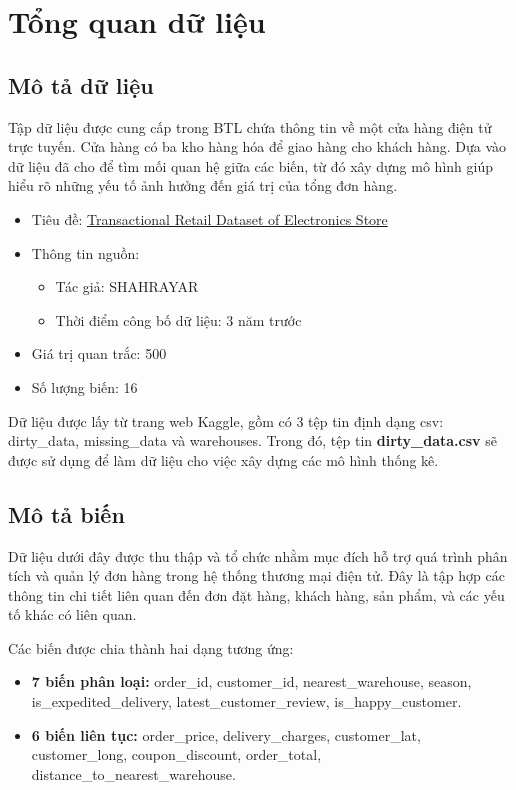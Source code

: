 \section{Tổng quan dữ liệu}
\subsection{Mô tả dữ liệu}
Tập dữ liệu được cung cấp trong BTL chứa thông tin về một cửa hàng điện tử trực tuyến. Cửa hàng có ba kho hàng hóa để giao hàng cho khách hàng. Dựa vào dữ liệu đã cho để tìm mối quan hệ giữa các biến, từ đó xây dựng mô hình giúp hiểu rõ những yếu tố ảnh hưởng đến giá trị của tổng đơn hàng.

\begin{itemize}
    \item Tiêu đề: \href{https://www.kaggle.com/datasets/muhammadshahrayar/transactional-retail-dataset-of-electronics-store?select=dirty_data.csv}{Transactional Retail Dataset of Electronics Store}
    \item Thông tin nguồn:
        \begin{itemize}
            \item Tác giả: SHAHRAYAR
            \item Thời điểm công bố dữ liệu: 3 năm trước
        \end{itemize}
    \item Giá trị quan trắc: 500
    \item Số lượng biến: 16
\end{itemize}

Dữ liệu được lấy từ trang web Kaggle, gồm có 3 tệp tin định dạng csv: dirty\_data, missing\_data và warehouses. Trong đó, tệp tin \textbf{dirty\_data.csv} sẽ được sử dụng để làm dữ liệu cho việc xây dựng các mô hình thống kê.
\subsection{Mô tả biến}
Dữ liệu dưới đây được thu thập và tổ chức nhằm mục đích hỗ trợ quá trình phân tích và quản lý đơn hàng trong hệ thống thương mại điện tử. Đây là tập hợp các thông tin chi tiết liên quan đến đơn đặt hàng, khách hàng, sản phẩm, và các yếu tố khác có liên quan.

Các biến được chia thành hai dạng tương ứng:
\begin{itemize}
    \item \textbf{7 biến phân loại:} order\_id, customer\_id, nearest\_warehouse, season, is\_expedited\_delivery, latest\_customer\_review, is\_happy\_customer.
    \item \textbf{6 biến liên tục:} order\_price, delivery\_charges, customer\_lat, customer\_long, coupon\_discount, order\_total, distance\_to\_nearest\_warehouse. 
\end{itemize}

